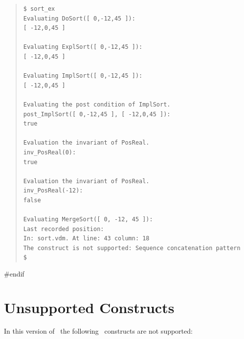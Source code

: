 \documentclass[\pformat,12pt]{article}
\begin{document}
\begin{quote}
\begin{verbatim}
$ sort_ex
Evaluating DoSort([ 0,-12,45 ]):
[ -12,0,45 ]

Evaluating ExplSort([ 0,-12,45 ]):
[ -12,0,45 ]

Evaluating ImplSort([ 0,-12,45 ]):
[ -12,0,45 ]

Evaluating the post condition of ImplSort. 
post_ImplSort([ 0,-12,45 ], [ -12,0,45 ]):
true

Evaluation the invariant of PosReal. 
inv_PosReal(0):
true

Evaluation the invariant of PosReal. 
inv_PosReal(-12):
false

Evaluating MergeSort([ 0, -12, 45 ]):
Last recorded position:
In: sort.vdm. At line: 43 column: 18
The construct is not supported: Sequence concatenation pattern
$
\end{verbatim}
\end{quote}
#endif

\section{Unsupported Constructs}\label{sec:unsupported}

In this version of \tcg\ the following \VDM\ constructs are
not supported:
\end{document}
